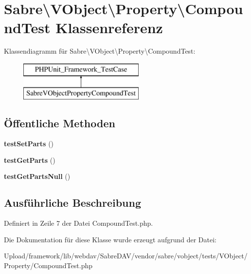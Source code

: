 \hypertarget{class_sabre_1_1_v_object_1_1_property_1_1_compound_test}{}\section{Sabre\textbackslash{}V\+Object\textbackslash{}Property\textbackslash{}Compound\+Test Klassenreferenz}
\label{class_sabre_1_1_v_object_1_1_property_1_1_compound_test}
Klassendiagramm für Sabre\textbackslash{}V\+Object\textbackslash{}Property\textbackslash{}Compound\+Test\+:\begin{figure}[H]
\begin{center}
\leavevmode
\includegraphics[height=2.000000cm]{class_sabre_1_1_v_object_1_1_property_1_1_compound_test}
\end{center}
\end{figure}
\subsection*{Öffentliche Methoden}
\begin{DoxyCompactItemize}
\item 
\mbox{\label{class_sabre_1_1_v_object_1_1_property_1_1_compound_test_a2607e3c2fb8c1f6017fe16a10e4753e2}} 
{\bfseries test\+Set\+Parts} ()
\item 
\mbox{\label{class_sabre_1_1_v_object_1_1_property_1_1_compound_test_a908941e982e13a1466bf3de7d0a780b2}} 
{\bfseries test\+Get\+Parts} ()
\item 
\mbox{\label{class_sabre_1_1_v_object_1_1_property_1_1_compound_test_a83651bba56dc69cffce501012726d564}} 
{\bfseries test\+Get\+Parts\+Null} ()
\end{DoxyCompactItemize}


\subsection{Ausführliche Beschreibung}


Definiert in Zeile 7 der Datei Compound\+Test.\+php.



Die Dokumentation für diese Klasse wurde erzeugt aufgrund der Datei\+:\begin{DoxyCompactItemize}
\item 
Upload/framework/lib/webdav/\+Sabre\+D\+A\+V/vendor/sabre/vobject/tests/\+V\+Object/\+Property/Compound\+Test.\+php\end{DoxyCompactItemize}
